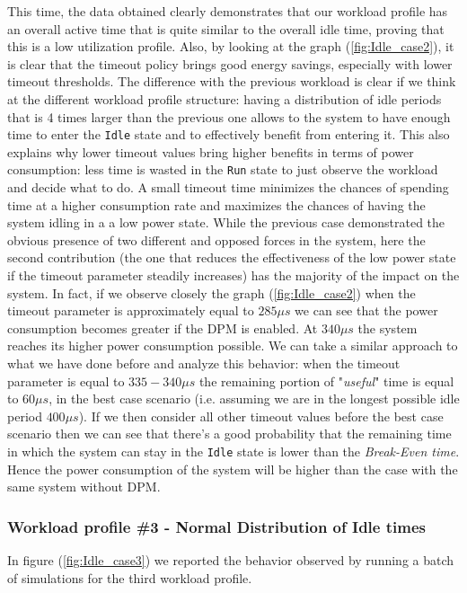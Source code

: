 \documentclass[a4paper]{article}
\begin{document}
            This time, the data obtained clearly demonstrates that our workload profile has an overall active time that is quite similar to the overall idle time, proving that this is a low utilization profile. Also, by looking at the graph (\ref{fig:Idle_case2}), it is clear that the timeout policy brings good energy savings, especially with lower timeout thresholds.
            The difference with the previous workload is clear if we think at the different workload profile structure: having a distribution of idle periods that is 4 times larger than the previous one allows to the system to have enough time to enter the \texttt{Idle} state and to effectively benefit from entering it. This also explains why lower timeout values bring higher benefits in terms of power consumption: less time is wasted in the \texttt{Run} state to just observe the workload and decide what to do. A small timeout time minimizes the chances of spending time at a higher consumption rate and maximizes the chances of having the system idling in a a low power state.
            While the previous case demonstrated the obvious presence of two different and opposed forces in the system, here the second contribution (the one that reduces the effectiveness of the low power state if the timeout parameter steadily increases) has the majority of the impact on the system.
            In fact, if we observe closely the graph (\ref{fig:Idle_case2}) when the timeout parameter is approximately equal to $285 \mu s$ we can see that the power consumption becomes greater if the DPM is enabled.
            At $340 \mu s$ the system reaches its higher power consumption possible. We can take a similar approach to what we have done before and analyze this behavior: when the timeout parameter is equal to $335-340 \mu s$ the remaining portion of "\emph{useful}" time is equal to $60 \mu s$, in the best case scenario (i.e. assuming we are in the longest possible idle period $400 \mu s$). If we then consider all other timeout values before the best case scenario then we can see that there's a good probability that the remaining time in which the system can stay in the \texttt{Idle} state is lower than the \emph{Break-Even time}. Hence the power consumption of the system will be higher than the case with the same system without DPM.

        \subsubsection{Workload profile \#3 - Normal Distribution of Idle times}
            In figure (\ref{fig:Idle_case3}) we reported the behavior observed by running a batch of simulations for the third workload profile.
\end{document}
